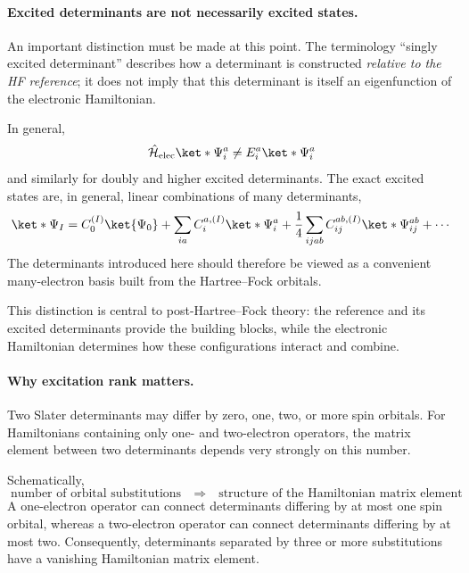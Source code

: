 \documentclass[11pt,a4paper,titlepage]{article}
\numberwithin{equation}{section}
\newcommand{\chH}{\Hat{\mathcal{H}}}
\begin{document}
\paragraph{Excited determinants are not necessarily excited states.}

An important distinction must be made at this point. The terminology
``singly excited determinant'' describes how a determinant is constructed
\emph{relative to the HF reference}; it does not imply that this determinant
is itself an eigenfunction of the electronic Hamiltonian.

In general,
\begin{equation}
  \chH_\text{elec}\ket*{\Psi_i^a}
  \neq
  E_i^a\ket*{\Psi_i^a}
\end{equation}
and similarly for doubly and higher excited determinants. The exact excited
states are, in general, linear combinations of many determinants,
\begin{equation}
  \ket*{\Psi_I}
  =
  C_0^{(I)}\ket{\Psi_0}
  +
  \sum_{ia}
  C_i^{a,(I)}
  \ket*{\Psi_i^a}
  +
  \frac{1}{4}
  \sum_{ijab}
  C_{ij}^{ab,(I)}
  \ket*{\Psi_{ij}^{ab}}
  +
  \cdots
\end{equation}
The determinants introduced here should therefore be viewed as a convenient
many-electron basis built from the Hartree--Fock orbitals.

This distinction is central to post-Hartree--Fock theory: the reference and
its excited determinants provide the building blocks, while the electronic
Hamiltonian determines how these configurations interact and combine.


\paragraph{Why excitation rank matters.}

Two Slater determinants may differ by zero, one, two, or more spin orbitals.
For Hamiltonians containing only one- and two-electron operators, the matrix
element between two determinants depends very strongly on this number.

Schematically,
\begin{equation*}
  \boxed{
  \text{number of orbital substitutions}
  \quad\Longrightarrow\quad
  \text{structure of the Hamiltonian matrix element}
  }
\end{equation*}
A one-electron operator can connect determinants differing by at most one
spin orbital, whereas a two-electron operator can connect determinants
differing by at most two. Consequently, determinants separated by three or
more substitutions have a vanishing Hamiltonian matrix element.
\end{document}
